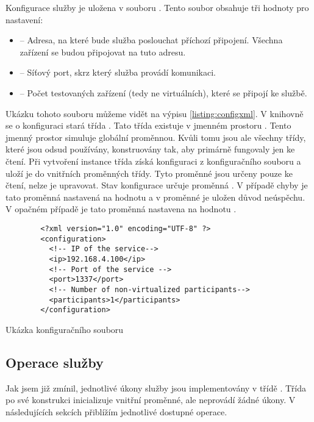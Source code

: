 Konfigurace služby je uložena v souboru . Tento soubor obsahuje tři hodnoty pro nastavení:

\begin{itemize}
    \item {} -- Adresa, na které bude služba poslouchat příchozí připojení. Všechna zařízení se budou připojovat na tuto adresu.
    \item {} -- Síťový port, skrz který služba provádí komunikaci.
    \item {} -- Počet testovaných zařízení (tedy ne virtuálních), které se připojí ke službě.   
\end{itemize}

Ukázku tohoto souboru můžeme vidět na výpisu \ref{listing:configxml}. V knihovně se o konfiguraci stará třída . Tato třída existuje v jmenném prostoru . Tento jmenný prostor simuluje globální proměnnou. Kvůli tomu jsou ale všechny třídy, které jsou odsud používány, konstruovány tak, aby primárně fungovaly jen ke čtení. Při vytvoření instance třída získá konfiguraci z konfiguračního souboru a uloží je do vnitřních proměnných třídy. Tyto proměnné jsou určeny pouze ke čtení, nelze je upravovat. Stav konfigurace určuje proměnná . V případě chyby je tato proměnná nastavená na hodnotu  a v proměnné  je uložen důvod neúspěchu. V opačném případě je tato proměnná nastavena na hodnotu .

\begin{listing}[htbp]
    \centering
    \begin{verbatim}
        <?xml version="1.0" encoding="UTF-8" ?>
        <configuration>
          <!-- IP of the service-->
          <ip>192.168.4.100</ip>
          <!-- Port of the service -->
          <port>1337</port>
          <!-- Number of non-virtualized participants-->
          <participants>1</participants>
        </configuration>
    \end{verbatim}
    \caption{Ukázka konfiguračního souboru}
    \label{listing:configxml}
\end{listing}


\subsection{Operace služby}

Jak jsem již zmínil, jednotlivé úkony služby jsou implementovány v třídě . 
Třída po své konstrukci inicializuje vnitřní proměnné, ale neprovádí žádné úkony. V následujících sekcích přiblížím jednotlivé dostupné operace.

